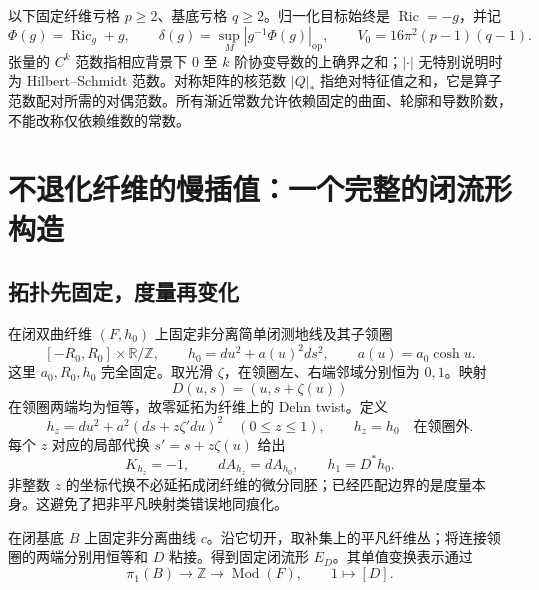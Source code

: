 \documentclass[UTF8,fontset=fandol,zihao=-4,oneside,openany]{ctexbook}
\theoremstyle{cjkplain}
\numberwithin{equation}{chapter}
\begin{document}
以下固定纤维亏格 $p\ge2$、基底亏格 $q\ge2$。归一化目标始终是 $\operatorname{Ric}=-g$，并记
\begin{equation}
 \Phi(g)=\operatorname{Ric}_g+g,\qquad
 \delta(g)=\sup_M|g^{-1}\Phi(g)|_{\mathrm{op}},\qquad
 V_0=16\pi^2(p-1)(q-1).
 \label{BUN:normalization}
\end{equation}
张量的 $C^k$ 范数指相应背景下 $0$ 至 $k$ 阶协变导数的上确界之和；$|\cdot|$ 无特别说明时为 Hilbert--Schmidt 范数。对称矩阵的核范数 $|Q|_*$ 指绝对特征值之和，它是算子范数配对所需的对偶范数。所有渐近常数允许依赖固定的曲面、轮廓和导数阶数，不能改称仅依赖维数的常数。

\section{不退化纤维的慢插值：一个完整的闭流形构造}
\label{BUN:slow}

\subsection{拓扑先固定，度量再变化}
在闭双曲纤维 $(F,h_0)$ 上固定非分离简单闭测地线及其子领圈
\[
 [-R_0,R_0]\times\mathbb R/\mathbb Z,
 \qquad h_0=du^2+a(u)^2ds^2,\qquad a(u)=a_0\cosh u.
\]
这里 $a_0,R_0,h_0$ 完全固定。取光滑 $\zeta$，在领圈左、右端邻域分别恒为 $0,1$。映射
\[
 D(u,s)=(u,s+\zeta(u))
\]
在领圈两端均为恒等，故零延拓为纤维上的 Dehn twist。定义
\begin{equation}
 h_z=du^2+a^2(ds+z\zeta' du)^2\quad(0\le z\le1),
 \qquad h_z=h_0\quad\text{在领圈外}.
 \label{BUN:fiber-path}
\end{equation}
每个 $z$ 对应的局部代换 $s'=s+z\zeta(u)$ 给出
\begin{equation}
 K_{h_z}=-1,\qquad dA_{h_z}=dA_{h_0},\qquad h_1=D^*h_0.
 \label{BUN:path-properties}
\end{equation}
非整数 $z$ 的坐标代换不必延拓成闭纤维的微分同胚；已经匹配边界的是度量本身。这避免了把非平凡映射类错误地同痕化。

在闭基底 $B$ 上固定非分离曲线 $c$。沿它切开，取补集上的平凡纤维丛；将连接领圈的两端分别用恒等和 $D$ 粘接。得到固定闭流形 $E_D$。其单值变换表示通过
\[
 \pi_1(B)\longrightarrow\mathbb Z\longrightarrow\operatorname{Mod}(F),
 \qquad 1\longmapsto[D].
\]
\end{document}
